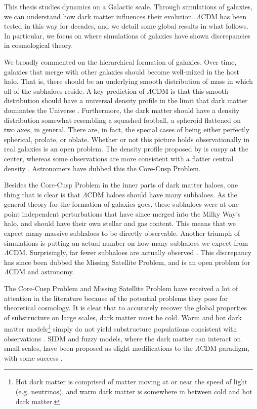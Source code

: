 This thesis studies dynamics on a Galactic scale. Through simulations of galaxies, we can understand how dark matter influences their evolution. $\Lambda$CDM has been tested in this way for decades, and we detail some global results in what follows. In particular, we focus on where simulations of galaxies have shown discrepancies in cosmological theory.

We broadly commented on the hierarchical formation of galaxies. Over time, galaxies that merge with other galaxies should become well-mixed in the host halo. That is, there should be an underlying smooth distribution of mass in which all of the subhaloes reside. A key prediction of $\Lambda$CDM is that this smooth distribution should have a universal density profile in the limit that dark matter dominates the Universe \citep{nfw}. Furthermore, the dark matter should have a density distribution somewhat resembling a squashed football, a spheroid flattened on two axes, in general. There are, in fact, the special cases of being either perfectly spherical, prolate, or oblate. Whether or not this picture holds observationally in real galaxies is an open problem. The density profile proposed by \citet{nfw} is cuspy at the center, whereas some observations are more consistent with a flatter central density \citep{de_blok_core_cusp}. Astronomers have dubbed this the Core-Cusp Problem. 

Besides the Core-Cusp Problem in the inner parts of dark matter haloes, one thing that is clear is that $\Lambda$CDM haloes should have many subhaloes. As the general theory for the formation of galaxies goes, these subhaloes were at one point independent perturbations that have since merged into the Milky Way's halo, and should have their own stellar and gas content. This means that we expect many massive subhaloes to be directly observable. Another triumph of simulations is putting an actual number on how many subhaloes we expect from $\Lambda$CDM. Surprisingly, far fewer subhaloes are actually observed \citep{mooresubhalos, Klypin1999, springel2008}. This discrepancy has since been dubbed the Missing Satellite Problem, and is an open problem for $\Lambda$CDM and astronomy.


The Core-Cusp Problem and Missing Satellite Problem have received a lot of attention in the literature because of the potential problems they pose for theoretical cosmology. It is clear that to accurately recover the global properties of substructure on large scales, dark matter must be cold. Warm and hot dark matter models\footnote{Hot dark matter is comprised of matter moving at or near the speed of light (e.g. neutrinos), and warm dark matter is somewhere in between cold and hot dark matter.} simply do not yield substructure populations consistent with observations \citep[for example]{alternate_dm}. SIDM and fuzzy models, where the dark matter can interact on small scales, have been proposed as slight modifications to the $\Lambda$CDM paradigm, with some success \citep[for example]{hui_2017}. 

